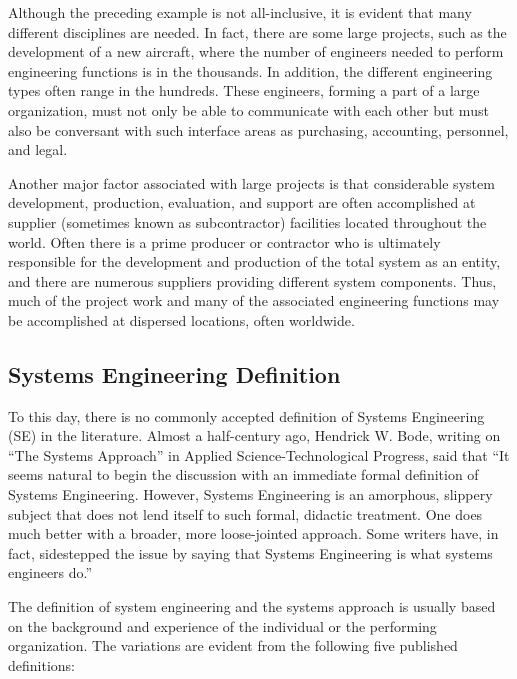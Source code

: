 Although the preceding example is not all-inclusive, it is evident that many different disciplines are needed. In fact, there are some large projects, such as the development of a new aircraft, where the number of engineers needed to perform engineering functions is in the thousands. In addition, the different engineering types often range in the hundreds. These engineers, forming a part of a large organization, must not only be able to communicate with each other but must also be conversant with such interface areas as purchasing, accounting, personnel, and legal.

Another major factor associated with large projects is that considerable system development, production, evaluation, and support are often accomplished at supplier (sometimes known as subcontractor) facilities located throughout the world. Often there is a prime producer or contractor who is ultimately responsible for the development and production of the total system as an entity, and there are numerous suppliers providing different system components. Thus, much of the project work and many of the associated engineering functions may be accomplished at dispersed locations, often worldwide.

\subsection{Systems Engineering Definition}

To this day, there is no commonly accepted definition of Systems Engineering (SE) in the literature. Almost a half-century ago, Hendrick W. Bode, writing on ``The Systems Approach'' in Applied Science-Technological Progress, said that ``It seems natural to begin the discussion with an immediate formal definition of Systems Engineering. However, Systems Engineering is an amorphous, slippery subject that does not lend itself to such formal, didactic treatment. One does much better with a broader, more loose-jointed approach. Some writers have, in fact, sidestepped the issue by saying that Systems Engineering is what systems engineers do.''

The definition of system engineering and the systems approach is usually based on the background and experience of the individual or the performing organization. The variations are evident from the following five published definitions:

